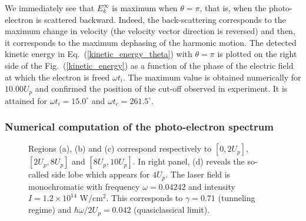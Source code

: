 \documentclass[a4paper]{article}
\begin{document}
We immediately see that $E_{k}^{\infty}$ is maximum when $\theta=\pi$, that is, when the photo-electron is scattered backward. Indeed, the back-scattering corresponds to the maximum change in velocity (the velocity vector direction is reversed) and then, it corresponds to the maximum dephasing of the harmonic motion. The detected kinetic energy in Eq.~(\ref{kinetic_energy_theta}) with $\theta=\pi$ is plotted on the right side of the Fig.~(\ref{kinetic_energy}) as a function of the phase of the electric field at which the electron is freed $\omega t_{i}$.
The maximum value is obtained numerically for $10.00 U_{p}$ and confirmed the position of the cut-off observed in experiment. It is attained for $\omega t_{i}=15.0^{\circ}$ and $\omega t_{c}=261.5^{\circ}$.


\subsubsection{Numerical computation of the photo-electron spectrum}
\label{computation_pes}

\begin{figure}[htp]
\begin{subfigure} [t]{0.5\textwidth}
 \resizebox{1\textwidth}{!}{}
\end{subfigure}
\begin{subfigure} [t]{0.5\textwidth}
\hspace{-1.5cm}
 \resizebox{1.6\textwidth}{!}{}
\end{subfigure}
 \caption{Regions (a), (b) and (c) correspond respectively to $[0, 2U_{p}]$, $[2U_{p}, 8U_{p}]$ and $[8U_{p}, 10U_{p}]$. In right panel, (d) reveals the so-called side lobe which appears for $4U_{p}$. The laser field is monochromatic with frequency $\omega=0.04242$ and intensity $I=1.2\times10^{14}$ W/cm$^{2}$. This corresponds to $\gamma=0.71$ (tunneling regime) and $\hbar\omega/2U_{p}=0.042$ (quasiclassical limit).}
\end{figure}
\end{document}
